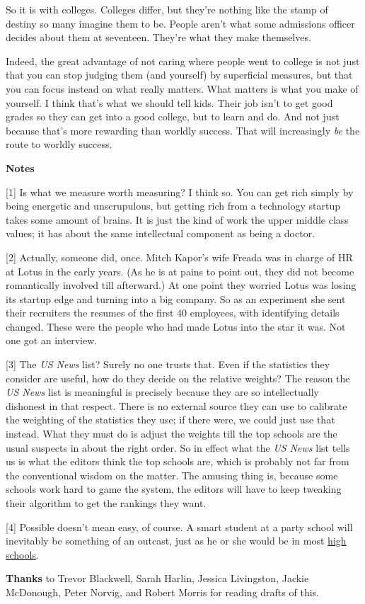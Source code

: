 So it is with colleges. Colleges differ, but they're nothing like the
stamp of destiny so many imagine them to be. People aren't what some
admissions officer decides about them at seventeen. They're what they
make themselves.

Indeed, the great advantage of not caring where people went to college
is not just that you can stop judging them (and yourself) by superficial
measures, but that you can focus instead on what really matters. What
matters is what you make of yourself. I think that's what we should tell
kids. Their job isn't to get good grades so they can get into a good
college, but to learn and do. And not just because that's more rewarding
than worldly success. That will increasingly \emph{be} the route to
worldly success.

\textbf{Notes}

{[}1{]} Is what we measure worth measuring? I think so. You can get rich
simply by being energetic and unscrupulous, but getting rich from a
technology startup takes some amount of brains. It is just the kind of
work the upper middle class values; it has about the same intellectual
component as being a doctor.

{[}2{]} Actually, someone did, once. Mitch Kapor's wife Freada was in
charge of HR at Lotus in the early years. (As he is at pains to point
out, they did not become romantically involved till afterward.) At one
point they worried Lotus was losing its startup edge and turning into a
big company. So as an experiment she sent their recruiters the resumes
of the first 40 employees, with identifying details changed. These were
the people who had made Lotus into the star it was. Not one got an
interview.

{[}3{]} The \emph{US News} list? Surely no one trusts that. Even if the
statistics they consider are useful, how do they decide on the relative
weights? The reason the \emph{US News} list is meaningful is precisely
because they are so intellectually dishonest in that respect. There is
no external source they can use to calibrate the weighting of the
statistics they use; if there were, we could just use that instead. What
they must do is adjust the weights till the top schools are the usual
suspects in about the right order. So in effect what the \emph{US News}
list tells us is what the editors think the top schools are, which is
probably not far from the conventional wisdom on the matter. The amusing
thing is, because some schools work hard to game the system, the editors
will have to keep tweaking their algorithm to get the rankings they
want.

{[}4{]} Possible doesn't mean easy, of course. A smart student at a
party school will inevitably be something of an outcast, just as he or
she would be in most \href{nerds.html}{high schools}.

\textbf{Thanks} to Trevor Blackwell, Sarah Harlin, Jessica Livingston,
Jackie McDonough, Peter Norvig, and Robert Morris for reading drafts of
this.
